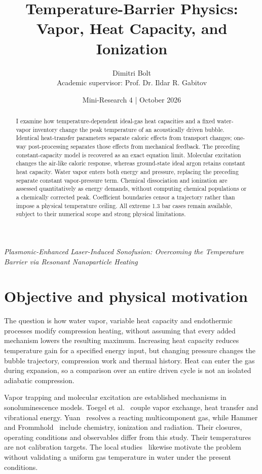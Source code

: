 \documentclass[10pt,a4paper]{article}
\title{\vspace{-12mm}\Large\bfseries Temperature-Barrier Physics:\\Vapor, Heat Capacity, and Ionization}
\author{Dimitri Bolt\\[2pt]\small Academic supervisor: Prof. Dr. Ildar R. Gabitov}
\date{Mini-Research 4 \quad | \quad 31 October 2026}
\begin{document}
\maketitle\vspace{-7mm}
\begin{center}\small\emph{Plasmonic-Enhanced Laser-Induced Sonofusion: Overcoming the Temperature Barrier via Resonant Nanoparticle Heating}\end{center}
\begin{abstract}
I examine how temperature-dependent ideal-gas heat capacities and a fixed water-vapor inventory change the peak temperature of an acoustically driven bubble. Identical heat-transfer parameters separate caloric effects from transport changes; one-way post-processing separates those effects from mechanical feedback. The preceding constant-capacity model is recovered as an exact equation limit. Molecular excitation changes the air-like caloric response, whereas ground-state ideal argon retains constant heat capacity. Water vapor enters both energy and pressure, replacing the preceding separate constant vapor-pressure term. Chemical dissociation and ionization are assessed quantitatively as energy demands, without computing chemical populations or a chemically corrected peak. Coefficient boundaries censor a trajectory rather than impose a physical temperature ceiling. All extreme 1.3 bar cases remain available, subject to their numerical scope and strong physical limitations.
\end{abstract}

\section{Objective and physical motivation}
The question is how water vapor, variable heat capacity and endothermic processes modify compression heating, without assuming that every added mechanism lowers the resulting maximum. Increasing heat capacity reduces temperature gain for a specified energy input, but changing pressure changes the bubble trajectory, compression work and thermal history. Heat can enter the gas during expansion, so a comparison over an entire driven cycle is not an isolated adiabatic compression.

Vapor trapping and molecular excitation are established mechanisms in sonoluminescence models. Toegel et al.~\cite{toegel} couple vapor exchange, heat transfer and vibrational energy. Yuan~\cite{yuan} resolves a reacting multicomponent gas, while Hammer and Frommhold~\cite{hammer} include chemistry, ionization and radiation. Their closures, operating conditions and observables differ from this study. Their temperatures are not calibration targets. The local studies~\cite{sadighi,flannigan,xu} likewise motivate the problem without validating a uniform gas temperature in water under the present conditions.
\end{document}
